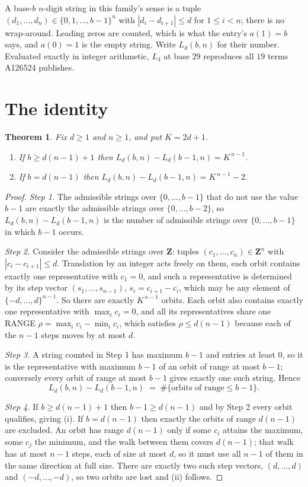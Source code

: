\documentclass[11pt,a4paper]{article}
\theoremstyle{plain}
\newtheorem{theorem}{Theorem}
\theoremstyle{definition}
\begin{document}
A base-$b$ $n$-digit string in this family's sense is a tuple
$(d_1,\dots,d_n)\in\{0,1,\dots,b-1\}^{n}$ with $|d_i-d_{i+1}|\le d$ for $1\le i<n$; there
is no wrap-around. Leading zeros are counted, which is what the entry's $a(1)=b$ says, and
$a(0)=1$ is the empty string. Write $L_d(b,n)$ for their number. Evaluated exactly in integer
arithmetic, $L_{4}$ at base $29$ reproduces all $19$ terms A126524 publishes.

\section{The identity}

\begin{theorem}
Fix $d\ge1$ and $n\ge1$, and put $K=2d+1$.
\begin{enumerate}
\item[(i)] If $b\ge d(n-1)+1$ then $L_d(b,n)-L_d(b-1,n)=K^{\,n-1}$.
\item[(ii)] If $b=d(n-1)$ then $L_d(b,n)-L_d(b-1,n)=K^{\,n-1}-2$.
\end{enumerate}
\end{theorem}

\begin{proof}
\emph{Step 1.} The admissible strings over $\{0,\dots,b-1\}$ that do not use the value $b-1$
are exactly the admissible strings over $\{0,\dots,b-2\}$, so $L_d(b,n)-L_d(b-1,n)$ is the
number of admissible strings over $\{0,\dots,b-1\}$ in which $b-1$ occurs.

\emph{Step 2.} Consider the admissible strings over $\mathbf{Z}$: tuples
$(c_1,\dots,c_n)\in\mathbf{Z}^{n}$ with $|c_i-c_{i+1}|\le d$. Translation by an integer acts
freely on them, each orbit contains exactly one representative with $c_1=0$, and such a
representative is determined by its step vector $(s_1,\dots,s_{n-1})$, $s_i=c_{i+1}-c_i$,
which may be any element of $\{-d,\dots,d\}^{n-1}$. So there are exactly $K^{\,n-1}$ orbits.
Each orbit also contains exactly one representative with $\max_i c_i=0$, and all its
representatives share one RANGE $\rho=\max_ic_i-\min_ic_i$, which satisfies
$\rho\le d(n-1)$ because each of the $n-1$ steps moves by at most $d$.

\emph{Step 3.} A string counted in Step 1 has maximum $b-1$ and entries at least $0$, so it is
the representative with maximum $b-1$ of an orbit of range at most $b-1$; conversely every orbit
of range at most $b-1$ gives exactly one such string. Hence
\[
L_d(b,n)-L_d(b-1,n)\;=\;\#\{\text{orbits of range}\le b-1\} .
\]

\emph{Step 4.} If $b\ge d(n-1)+1$ then $b-1\ge d(n-1)$ and by Step 2 every orbit qualifies,
giving (i). If $b=d(n-1)$ then exactly the orbits of range $d(n-1)$ are excluded. An orbit has
range $d(n-1)$ only if some $c_i$ attains the maximum, some $c_j$ the minimum, and the walk
between them covers $d(n-1)$; that walk has at most $n-1$ steps, each of size at most $d$, so it
must use all $n-1$ of them in the same direction at full size. There are exactly two such step
vectors, $(d,\dots,d)$ and $(-d,\dots,-d)$, so two orbits are lost and (ii) follows.
\end{proof}
\end{document}
